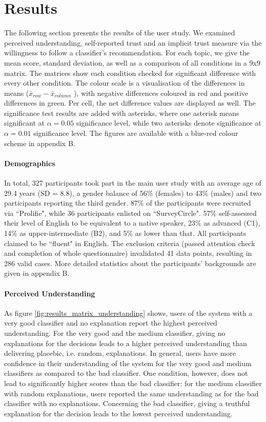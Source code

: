 \section{Results}
The following section presents the results of the user study. We examined perceived understanding, self-reported trust and an implicit trust measure via the willingness to follow a classifier's recommendation. For each topic, we give the mean score, standard deviation, as well as a comparison of all conditions in a 9x9 matrix.\newline
The matrices show each condition checked for significant difference with every other condition. The colour scale is a visualisation of the differences in means ($\bar{x}_{row} - \bar{x}_{column}$ ), with negative differences coloured in red and positive differences in green. Per cell, the net difference values are displayed as well. The significance test results are added with asterisks, where one asterisk means significant at $\alpha=0.05$ significance level, while two asterisks denote significance at $\alpha=0.01$ significance level. The figures are available with a blue-red colour scheme in appendix B.\newline 

\paragraph{Demographics}
In total, 327 participants took part in the main user study with an average age of 29.4 years (SD = 8.8), a gender balance of 56\% (females) to 43\% (males) and two participants reporting the third gender. 87\% of the participants were recruited via ``Prolific", while 36 participants enlisted on ``SurveyCircle". 57\% self-assessed their level of English to be equivalent to a native speaker, 23\% as advanced (C1), 14\% as upper-intermediate (B2), and 5\% as lower than that. All participants claimed to be ``fluent" in English. The exclusion criteria (passed attention check and completion of whole questionnaire) invalidated 41 data points, resulting in 286 valid cases. More detailed statistics about the participants' backgrounds are given in appendix B.\newline

\paragraph{Perceived Understanding}
As figure \ref{fig:results_matrix_understanding} shows, users of the system with a very good classifier and no explanation report the highest perceived understanding. For the very good and the medium classifier, giving no explanations for the decisions leads to a higher perceived understanding than delivering placebic, i.e. random, explanations. In general, users have more confidence in their understanding of the system for the very good and medium classifiers as compared to the bad classifier. One condition, however, does not lead to significantly higher scores than the bad classifier: for the medium classifier with random explanations, users reported the same understanding as for the bad classifier with no explanations. Concerning the bad classifier, giving a truthful explanation for the decision leads to the lowest perceived understanding.

